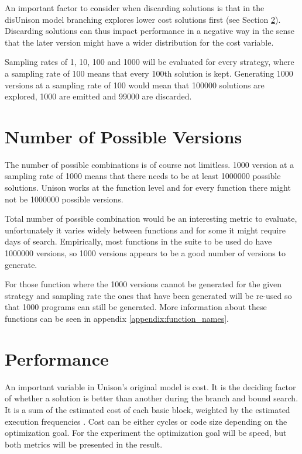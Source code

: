 An important factor to consider when discarding solutions is that in the disUnison model
branching explores lower cost solutions first (see Section \ref{sec:performance}). Discarding
solutions can thus impact performance in a negative way in the sense that the later
version might have a wider distribution for the cost variable.

Sampling rates of 1, 10, 100 and 1000 will be evaluated for every strategy, where a
sampling rate of 100 means that every 100th solution is kept. Generating 1000 versions
at a sampling rate of 100 would mean that 100000 solutions are explored, 1000 are emitted
and 99000 are discarded.

\section{Number of Possible Versions}

The number of possible combinations is of course not limitless. 1000 version at a sampling
rate of 1000 means that there needs to be at least 1000000 possible solutions. Unison works
at the function level and for every function there might not be 1000000 possible versions.

Total number of possible combination would be an interesting metric to evaluate, unfortunately
it varies widely between functions and for some it might require days of search. Empirically,
most functions in the suite to be used do have 1000000 versions, so 1000 versions appears
to be a good number of versions to generate.

For those function where the 1000 versions cannot be generated for the given strategy and
sampling rate the ones that have been generated will be re-used so that 1000 programs can
still be generated. More information about these functions can be seen in appendix
\ref{appendix:function_names}.

\section{Performance}
\label{sec:performance}

An important variable in Unison's original model is cost. It is the deciding factor of
whether a solution is better than another during the branch and bound search. It is a sum
of the estimated cost of each basic block, weighted by the estimated execution frequencies
\cite{unison-docs}. Cost can be either cycles or code size depending on the optimization
goal. For the experiment the optimization goal will be speed, but both metrics will be
presented in the result.

